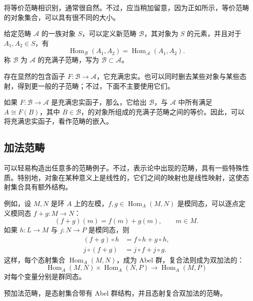 将等价范畴相识别，通常很自然。不过，应当稍加留意，因为正如所示，等价范畴的对象集合，可以具有很不同的大小。

\begin{definition*}\label{def:4.full-subcategory}
给定范畴 $\mathcal{A}$ 的一族对象 $S$，可以定义新范畴 $\mathcal{B}$，其对象为 $S$ 的元素，并且对于 $A_1,A_2\in S$，有
\[
\operatorname{Hom}_{\mathcal{B}}(A_1,A_2)
=\operatorname{Hom}_{\mathcal{A}}(A_1,A_2).
\]
称 $\mathcal{B}$ 为 $\mathcal{A}$ 的充满子范畴，写为 $\mathcal{B}\subset\mathcal{A}$。
\end{definition*}
存在显然的包含函子 $F\colon\mathcal{B}\to\mathcal{A}$，它充满忠实。也可以同时删去某些对象与某些态射，得到更一般的子范畴；不过，下面不主要使用它们。

如果 $F\colon\mathcal{B}\to\mathcal{A}$ 是充满忠实函子，那么，它给出 $\mathcal{B}$，与 $\mathcal{A}$ 中所有满足 $A\cong F(B)$，其中 $B\in\mathcal{B}$，的对象所组成的充满子范畴之间的等价。因此，可以将充满忠实函子，看作范畴的嵌入。

\subsection{加法范畴}\label{sec:4.1.3}

可以轻易构造出任意多的范畴例子。不过，表示论中出现的范畴，具有一些特殊性质。特别地，对象在某种意义上是线性的，它们之间的映射也是线性映射，这使态射集合具有额外结构。

例如，设 $M,N$ 是环 $A$ 上的左模，$f,g\in\operatorname{Hom}_A(M,N)$ 是模同态，可以逐点定义模同态 $f+g\colon M\to N$：
\[
(f+g)(m)=f(m)+g(m),\qquad m\in M.
\]
如果 $h\colon L\to M$ 与 $j\colon N\to P$ 是模同态，则
\[
\begin{aligned}
(f+g)\circ h&=f\circ h+g\circ h,\\
j\circ(f+g)&=j\circ f+j\circ g.
\end{aligned}
\]
这样，每个态射集合 $\operatorname{Hom}_A(M,N)$，成为 Abel 群，复合法则成为双加法的：
\[
\operatorname{Hom}_A(M,N)\times\operatorname{Hom}_A(N,P)
\longrightarrow\operatorname{Hom}_A(M,P)
\]
对每个变量分别是群同态。

\begin{definition}\label{def:4.14}
预加法范畴，是态射集合带有 Abel 群结构，并且态射复合双加法的范畴。
\end{definition}

